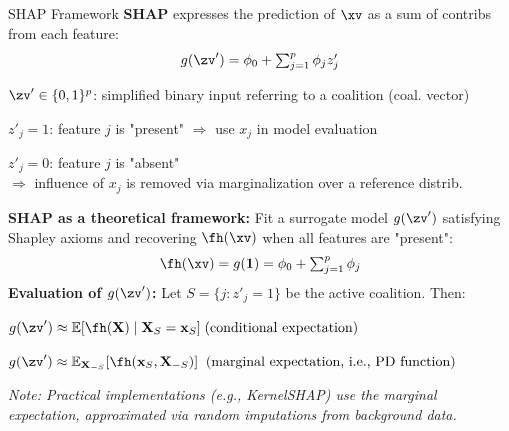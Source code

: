 \documentclass[10pt,compress,t,notes=noshow, xcolor=table]{beamer}
\begin{document}
\begin{framev}[align=top]{SHAP Framework }
\textbf{SHAP} expresses the prediction of $\xv$ as a sum of contribs from each feature:
$$
g(\zv') = \phi_0 + \textstyle\sum_{j=1}^p \phi_j z'_j
$$
\begin{itemizeM}
\item $\zv' \in \{0,1\}^p$: simplified binary input referring to a coalition (coal. vector)
\item $z'_j = 1$: feature $j$ is "present" $\Rightarrow$ use $x_j$ in model evaluation
\item $z'_j = 0$: feature $j$ is "absent"\\
$\Rightarrow$ influence of $x_j$ is removed via marginalization over a reference distrib.%
\end{itemizeM}
\pause
\textbf{SHAP as a theoretical framework:} Fit a surrogate model $g(\zv')$ satisfying Shapley axioms and recovering $\fh(\xv)$ when all features are "present":
$$
\fh(\xv) = g(\mathbf{1}) = \phi_0 + \textstyle\sum_{j=1}^p \phi_j
$$
\textbf{Evaluation of $g(\zv')$:} Let $S = \{ j : z'_j = 1 \}$ be the active coalition. Then:
\begin{itemizeM}
\item $g(\zv') \approx \mathbb{E}[ \fh(\mathbf{X}) \mid \mathbf{X}_S = \mathbf{x}_S]\;\text{(conditional expectation)}$
\item $g(\zv') \approx \mathbb{E}_{\mathbf{X}_{-S}} [ \fh(\mathbf{x}_S, \mathbf{X}_{-S}) ] \;\;\text{(marginal expectation, i.e., PD function)}$
\item \textit{Note: Practical implementations (e.g., KernelSHAP) use the marginal expectation, approximated via random imputations from background data.}
\end{itemizeM}
\end{framev}



\end{document}
